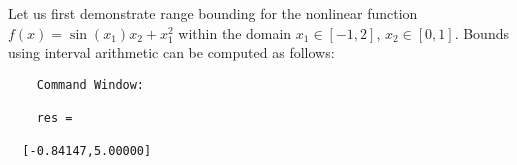 Let us first demonstrate range bounding for the nonlinear function $f(x) = \sin(x_1) x_2 + x_1^2$ within the domain $x_1 \in [-1,2]$, $x_2 \in [0,1]$. Bounds using interval arithmetic can be computed as follows:

\begin{center}
    \begin{minipage}[t]{0.50\textwidth}
        \vspace{10pt}
        \footnotesize
        
    \end{minipage}
    \begin{minipage}[t]{0.25\textwidth}
        \vspace{10pt}

        \begin{verbatim}
	Command Window:
	
	res =

  [-0.84147,5.00000]
        \end{verbatim}
    \end{minipage}
\end{center}






